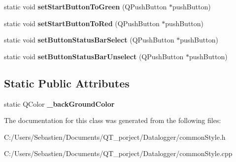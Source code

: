 \begin{DoxyCompactItemize}
\item 
\mbox{\label{class_common_style_a3cc171d4a73f5e8b9360c5fb35435d78}} 
static void {\bfseries set\+Start\+Button\+To\+Green} (Q\+Push\+Button $\ast$push\+Button)
\item 
\mbox{\label{class_common_style_a1ac46f0a17f5e0dcfebd8408f82920c3}} 
static void {\bfseries set\+Start\+Button\+To\+Red} (Q\+Push\+Button $\ast$push\+Button)
\item 
\mbox{\label{class_common_style_a0b2630a7ec00bb9f036c8bae70c391a8}} 
static void {\bfseries set\+Button\+Status\+Bar\+Select} (Q\+Push\+Button $\ast$push\+Button)
\item 
\mbox{\label{class_common_style_a75fdf21b0bd011263558ae8c6bce2965}} 
static void {\bfseries set\+Button\+Status\+Bar\+Unselect} (Q\+Push\+Button $\ast$push\+Button)
\end{DoxyCompactItemize}
\subsection*{Static Public Attributes}
\begin{DoxyCompactItemize}
\item 
\mbox{\label{class_common_style_a47f2802ffb2c83dade0d52107f8df9a1}} 
static Q\+Color {\bfseries \+\_\+back\+Ground\+Color}
\end{DoxyCompactItemize}


The documentation for this class was generated from the following files\+:\begin{DoxyCompactItemize}
\item 
C\+:/\+Users/\+Sebastien/\+Documents/\+Q\+T\+\_\+porject/\+Datalogger/common\+Style.\+h\item 
C\+:/\+Users/\+Sebastien/\+Documents/\+Q\+T\+\_\+porject/\+Datalogger/common\+Style.\+cpp\end{DoxyCompactItemize}
